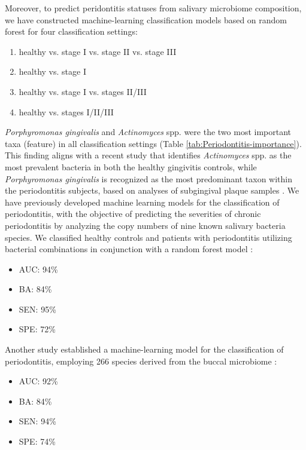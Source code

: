 \documentclass[11pt, a4paper, onecolumn, oneside]{report}
\begin{document}
            Moreover, to predict peridontitis statuses from salivary microbiome composition, we have constructed machine-learning classification models based on random forest for four classification settings:
            \begin{enumerate}
                \item healthy vs. stage I vs. stage II vs. stage III
                \item healthy vs. stage I
                \item healthy vs. stage I vs. stages II/III
                \item healthy vs. stages I/II/III
            \end{enumerate}
            \textit{Porphyromonas gingivalis} and \textit{Actinomyces} spp. were the two most important taxa (feature) in all classification settings (Table \ref{tab:Periodontitis-importance}). This finding aligns with a recent study that identifies \textit{Actinomyces} spp. as the most prevalent bacteria in both the healthy gingivitis controls, while \textit{Porphyromonas gingivalis} is recognized as the most predominant taxon within the periodontitis subjects, based on analyses of subgingival plaque samples \cite{Periodontitis-11}. We have previously developed machine learning models for the classification of periodontitis, with the objective of predicting the severities of chronic periodontitis by analyzing the copy numbers of nine known salivary bacteria species. We classified healthy controls and patients with periodontitis utilizing bacterial combinations in conjunction with a random forest model \cite{Periodontitis-diagnosis-8}:
            \begin{itemize}[noitemsep,nolistsep]
                \item AUC: 94\%
                \item BA: 84\%
                \item SEN: 95\%
                \item SPE: 72\%
            \end{itemize}

            Another study established a machine-learning model for the classification of periodontitis, employing 266 species derived from the buccal microbiome \cite{Periodontitis-35}:
            \begin{itemize}[noitemsep,nolistsep]
                \item AUC: 92\%
                \item BA: 84\%
                \item SEN: 94\%
                \item SPE: 74\%
            \end{itemize}
\end{document}
